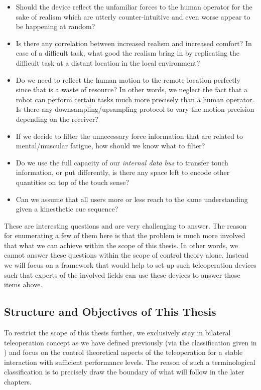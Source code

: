 \begin{itemize}
	\item Should the device reflect the unfamiliar forces to the human operator for the sake of realism which are utterly counter-intuitive and even worse appear to be happening at random? 
    \item Is there any correlation between increased realism and increased comfort? In case of a difficult task, what good the realism bring in by replicating the difficult task at a distant location in the local environment?
    \item Do we need to reflect the human motion to the remote location perfectly since that is a waste of resource? In other words, we neglect the fact that a robot can perform certain tasks much more precisely than a human operator. Is there any downsampling/upsampling protocol to vary the motion precision depending on the receiver?
    \item If we decide to filter the unnecessary force information that are related to mental/muscular fatigue, how should we know what to filter? 
    \item Do we use the full capacity of our \emph{internal data bus} to transfer touch information, or put differently, is there any space left to encode other quantities on top of the touch sense?
    \item Can we assume that all users more or less reach to the same understanding given a kinesthetic cue sequence?
\end{itemize}

These are interesting questions and are very challenging to answer. The reason for enumerating a few of them here is that the problem is much more involved that what we can achieve within the scope of this thesis. In other words, we cannot answer these questions within the scope of control theory alone. Instead we will focus on a framework that would help to set up such teleoperation devices such that experts of the involved fields can use these devices to answer those items above. 



\subsection{Structure and Objectives of This Thesis}
To restrict the scope of this thesis further, we exclusively stay in bilateral teleoperation concept as we have defined previously (via the classification given in ) and focus on the control theoretical aspects of the teleoperation for a stable interaction with sufficient performance levels. The reason of such a terminological classification is to precisely draw the boundary of what will follow in the later chapters. 

